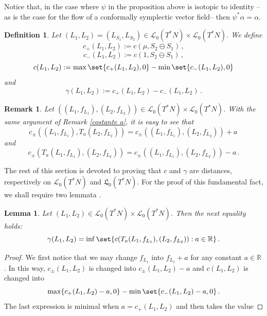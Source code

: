 \documentclass{article}
\newcommand{\1}{\mathbbm{1}}
\newtheorem{lem}[thm]{Lemma}
\newtheorem{defn}[thm]{Definition}
\newtheorem{rem}[thm]{Remark}
\theoremstyle{remark}
\begin{document}
{{\noindent Notice that, in the case where $\psi$ in the proposition above is isotopic to identity --as is the case for the flow of a conformally symplectic vector field-- then  $\psi^*\alpha=\alpha$. 

\begin{defn} Let $(L_1,L_2) = (L_{S_1}, L_{S_2}) \in \mathscr{L}_0(T^*N) \times  \mathscr{L}_0(T^*N)$. We define
\begin{equation*}
c_+(L_1, L_2) :=c (\mu, S_2 \ominus S_1)\, ,
\end{equation*}
\begin{equation*}
c_-(L_1, L_2):=c(1, S_2\ominus S_1)\, ,
\end{equation*}
\begin{equation*}
c(L_1, L_2) := \max \set{ c_+(L_1,L_2),0 } - \min \set{c_-(L_1,L_2),0 } 
\end{equation*}
and
\begin{equation*}
\gamma(L_1, L_2) :=c_+(L_1,L_2) - c_-(L_1, L_2)\, .
\end{equation*}
\end{defn}
\begin{rem}
\textnormal{Let $((L_1, f_{L_1}),(L_2,f_{L_2})) \in \mathscr{L}_0(T^*N) \times \mathscr{L}_0(T^*N)$. With the same argument of Remark \ref{costante a}, it is easy to see that
$$c_\pm((L_1,f_{L_1}),T_a(L_2,f_{L_2})) = c_\pm((L_1,f_{L_1}),(L_2,f_{L_2})) + a\,$$
and
$$c_\pm(T_a(L_1,f_{L_1}),(L_2,f_{L_2})) = c_\pm((L_1,f_{L_1}),(L_2,f_{L_2})) - a\,.$$}
\end{rem}
\indent The rest of this section is devoted to proving that $c$ and $\gamma$ are distances, respectively on $\mathscr{L}_0(T^*N)$ and $\mathfrak{L}_0(T^*N)$. For the proof of this fundamental fact, we shall require two lemmata . 
\begin{lem} \label{mag zero} Let $(L_1,L_2) \in \mathscr{L}_0(T^*N) \times  \mathscr{L}_0(T^*N)$. Then the next equality holds:
\begin{equation} \label{inf a}
\gamma(L_1,L_2) = \inf \set{ c(T_a(L_1,f_{L_1}),(L_2,f_{L_2})): a \in \mathbb{R}}\, .
\end{equation}
\end{lem}
\begin{proof} 
We first notice that we may change $f_{L_1}$ into $f_{L_1} + a$ for any constant $a \in \mathbb{R}$. In this way, $c_{\pm}(L_1,L_2)$ is changed into $c_{\pm}(L_1,L_2) - a$ and $c(L_1,L_2)$ is changed into 
$$\max\{ c_+(L_1,L_2) - a,0\} -\min \set{ c_-(L_1,L_2) - a,0 }\, .$$
The last expression is minimal when $a = c_+(L_1,L_2)$ and then takes the value

\end{proof}}}
\end{document}
